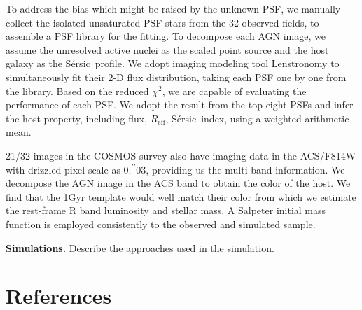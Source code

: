 \documentclass{natureprintstyle}
\newcommand{\hst}{{\it HST}}
\newcommand{\lhost}{$L_{\rm host}$}
\newcommand{\sersic}{S\'ersic}
\newcommand{\lenstronomy}{{\sc Lenstronomy}}
\newcommand{\reff}{{$R_{\mathrm{eff}}$}}
\newcommand{\mstar}{{$M_*$}}
\newcommand{\farcs}{\mbox{\ensuremath{.\!\!^{\prime\prime}}}}%
\begin{document}
To address the bias which might be raised by the unknown PSF, we manually collect the isolated-unsaturated PSF-stars from the 32 observed fields, to assemble a PSF library for the fitting. To decompose each AGN image, we assume the unresolved active nuclei as the scaled point source and the host galaxy as the \sersic\ profile. We adopt imaging modeling tool \lenstronomy\cite{lenstronomy} to simultaneously fit their 2-D flux distribution, taking each PSF one by one from the library. Based on the reduced $\chi^2$, we are capable of evaluating the performance of each PSF. We adopt the result from the top-eight PSFs and infer the host property, including flux, \reff, \sersic\ index, using a weighted arithmetic mean.

21/32 images in the COSMOS survey also have imaging data in the ACS/F814W with drizzled pixel scale as 0\farcs03, providing us the multi-band information. We decompose the AGN image in the ACS band to obtain the color of the host. We find that the 1Gyr template would well match their color from which we estimate the rest-frame R band luminosity and stellar mass. A Salpeter initial mass function is employed consistently to the observed and simulated sample.



\textbf{Simulations.} 
Describe the approaches used in the simulation.


\section*{References}
 
\end{document}

